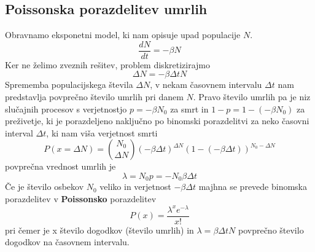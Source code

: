 \documentclass[11pt, a4paper]{article}
\begin{document}
\subsection{Poissonska porazdelitev umrlih}
Obravnamo eksponetni model, ki nam opisuje upad populacije $N$.
\begin{equation}
\frac{dN}{dt} = - \beta N
\end{equation}
Ker ne želimo zveznih rešitev, problem diskretizirajmo
\begin{equation}
\Delta N = - \beta  \Delta t N
\end{equation}
Sprememba populacijskega števila $\Delta N$, v nekam časovnem intervalu $\Delta t$ nam predstavlja povprečno število umrlih pri danem $N$. 
Pravo število umrlih pa je niz slučajnih procesov s verjetnostjo $p = -\beta N_0$ za smrt in $1 - p = 1 - (-\beta N_0)$ za preživetje, ki je porazdeljeno naključno po binomski porazdelitvi za neko časovni interval $\Delta t$, ki nam viša verjetnost smrti
\begin{equation}
P(x = \Delta N) = \binom{N_0}{\Delta N} (-\beta \Delta t )^{\Delta N } (1 - (- \beta \Delta t))^{N_0 - \Delta N}
\end{equation} 
povprečna vrednost umrlih je 
\begin{equation}
\lambda = N_0 p = -N_0 \beta \Delta t
\end{equation}
Če je število osbekov $N_0$ veliko in verjetnost $ -\beta \Delta t $ majhna se prevede binomska porazdelitev v \textbf{Poissonsko} porazdelitev
\begin{equation}
P(x) = \frac{\lambda^x e^{-\lambda}}{x!}
\end{equation}
pri čemer je x število dogodkov (število umrlih) in $\lambda = \beta \Delta t N$ povprečno število dogodkov na časovnem intervalu.
\end{document}
